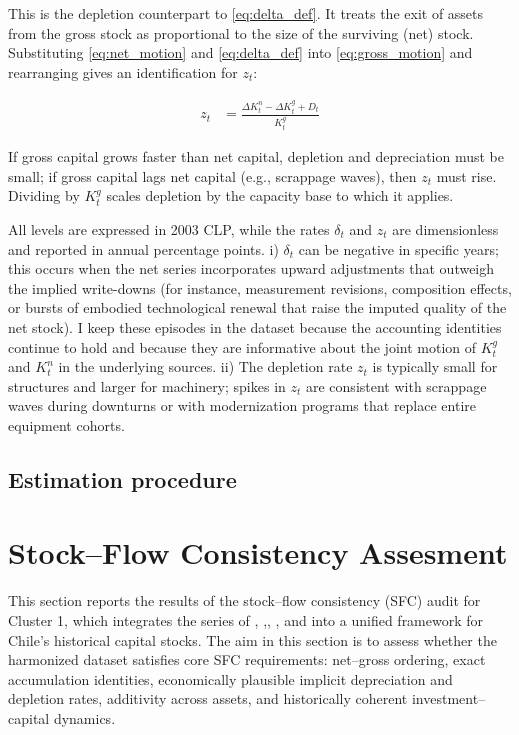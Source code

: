This is the depletion counterpart to \eqref{eq:delta_def}. It treats the exit of assets from the gross stock as proportional to the size of the surviving (net) stock. Substituting \eqref{eq:net_motion} and \eqref{eq:delta_def} into \eqref{eq:gross_motion} and rearranging gives an identification for $z_t$:

\begin{align}
z_t &= \frac{\Delta K^n_t - \Delta K^g_t + D_t}{K^g_t} \tag{6}\label{eq:z_ident}
\end{align}

If gross capital grows faster than net capital, depletion and depreciation must be small; if gross capital lags net capital (e.g., scrappage waves), then $z_t$ must rise. Dividing by $K^g_t$ scales depletion by the capacity base to which it applies.


All levels are expressed in 2003 CLP, while the rates $\delta_t$ and $z_t$ are dimensionless and reported in annual percentage points. i) $\delta_t$ can be negative in specific years; this occurs when the net series incorporates upward adjustments that outweigh the implied write-downs (for instance, measurement revisions, composition effects, or bursts of embodied technological renewal that raise the imputed quality of the net stock). I keep these episodes in the dataset because the accounting identities continue to hold and because they are informative about the joint motion of $K^g_t$ and $K^n_t$ in the underlying sources. ii) The depletion rate $z_t$ is typically small for structures and larger for machinery; spikes in $z_t$ are consistent with scrappage waves during downturns or with modernization programs that replace entire equipment cohorts.

\subsection{Estimation procedure}\label{subsec:estimation}

\section{Stock--Flow Consistency Assesment}

This section reports the results of the stock--flow consistency (SFC) audit for Cluster 1, which integrates the series of \citet{Hofman2000}, \citet{Tafunell2013},\citet{Tafunell2016}, \citet{PerezEyzaguirre2019}, and \citet{Diaz2016} into a unified framework for Chile’s historical capital stocks. The aim in this section is to assess whether the harmonized dataset satisfies core SFC requirements: net--gross ordering, exact accumulation identities, economically plausible implicit depreciation and depletion rates, additivity across assets, and historically coherent investment--capital dynamics.

